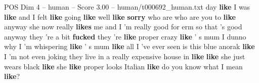 \begin{textsample}{POS Dim 4 – human – Score 3.00 – human/t000692\_human.txt}  \label{ex:f4_pos_012}
day \textbf{like} I was \textbf{like} and I felt \textbf{like} going \textbf{like} well \textbf{like} \textbf{sorry} who are who are you to \textbf{like} anyway she now really \textbf{likes} me and I 'm really good for erm so that 's good anyway they 're a bit \textbf{fucked} they 're \textbf{like} proper crazy \textbf{like} ' s mum I dunno why I 'm whispering \textbf{like} ' s mum \textbf{like} all I 've ever seen is this blue anorak \textbf{like} I 'm not even joking they live in a really expensive house in \textbf{like} \textbf{like} she just wears black \textbf{like} she \textbf{like} proper looks Italian \textbf{like} do you know what I mean \textbf{like}?

\end{textsample}
